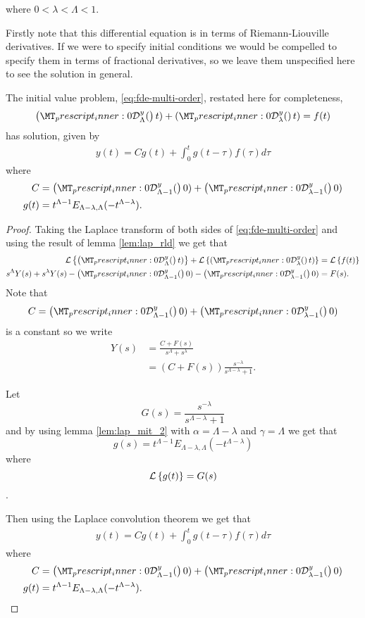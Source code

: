 where $ 0 < \lambda < \Lambda < 1 $.


Firstly note that this differential equation is in terms of Riemann-Liouville derivatives. If we were to specify
initial conditions we would be compelled to specify them in terms of fractional derivatives, so we leave them
unspecified here to see the solution in general.

\begin{lemma}
	The initial value problem, \ref{eq:fde-multi-order}, restated here for completeness,
	\begin{align}
		\rld{0}{\Lambda}{y}(t) + \rld{0}{\lambda}{y}(t) = f(t)
	\end{align}
	has solution, given by
	\begin{align}
		y(t) = C g(t) + \int_0^t g(t-\tau)f(\tau) d\tau
	\end{align}
	where
	\begin{align}
		C &= \rld{0}{\Lambda-1}{y}(0) + \rld{0}{\lambda-1}{y}(0) \\
		g(t) &= t^{\Lambda - 1} E_{\Lambda - \lambda, \Lambda}(-t^{\Lambda - \lambda}).
	\end{align}
\end{lemma}

\begin{proof}

	Taking the Laplace transform of both sides of \ref{eq:fde-multi-order} and using the result of lemma \ref{lem:lap_rld}
	we get that 
	\begin{align}
		\laplace{\rld{0}{\Lambda}{y}(t)} + \laplace{\rld{0}{\lambda}{y}(t)} &= \laplace{f(t)} \\
		s^\Lambda Y(s) + s^\lambda Y(s) - \rld{0}{\Lambda-1}{y}(0) - \rld{0}{\lambda-1}{y}(0) &= F(s).
	\end{align}
	Note that $$ C = \rld{0}{\Lambda-1}{y}(0) + \rld{0}{\lambda-1}{y}(0) $$ is a constant so we write
	\begin{align}
		Y(s) &= \frac{C + F(s)}{s^\Lambda + s^\lambda} \\
			&= \left( C + F(s)\right) \frac{s^{-\lambda}}{s^{\Lambda-\lambda} + 1}.
	\end{align}
	
	Let $$ G(s) = \frac{s^{-\lambda}}{s^{\Lambda-\lambda} + 1} $$
	and by using lemma \ref{lem:lap_mit_2} with $ \alpha = \Lambda - \lambda $ and $ \gamma = \Lambda $
	we get that $$ g(s) = t^{\Lambda  -1}E_{\Lambda - \lambda, \Lambda}(-t^{\Lambda - \lambda}) $$ where 
	$$ \mathcal{L} \left\{ g(t) \right\} = G(s) $$.
	
	Then using the Laplace convolution theorem we get that 
	\begin{align}
		y(t) = C g(t) + \int_0^t g(t-\tau)f(\tau) d\tau
	\end{align}
	where
	\begin{align}
		C &= \rld{0}{\Lambda-1}{y}(0) + \rld{0}{\lambda-1}{y}(0) \\
		g(t) &= t^{\Lambda - 1} E_{\Lambda - \lambda, \Lambda}(-t^{\Lambda - \lambda}).
	\end{align}
\end{proof}

